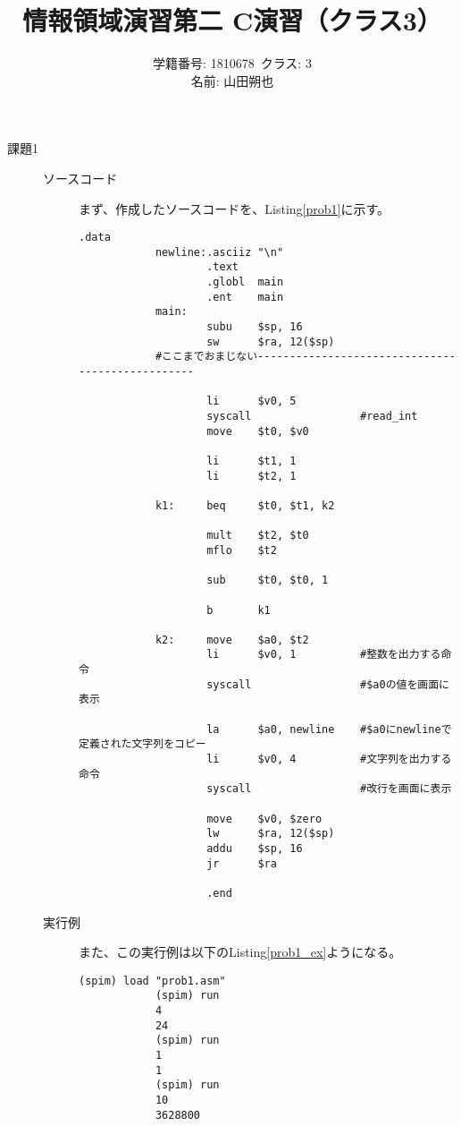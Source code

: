 \documentclass{jsarticle}
\title{情報領域演習第二 C演習（クラス3）}
\author{学籍番号: 1810678\ クラス: 3 \\
        名前: 山田朔也}
\begin{document}
    \maketitle
    \begin{description}
        \item[課題1]
        \begin{description}
            \item[ソースコード]
            まず、作成したソースコードを、Listing\ref{prob1}に示す。
            \begin{lstlisting}[caption=課題1のソースコード, label=prob1]
                    .data
            newline:.asciiz "\n"
                    .text
                    .globl  main
                    .ent    main
            main:
                    subu    $sp, 16
                    sw      $ra, 12($sp)
            #ここまでおまじない-------------------------------------------------

                    li      $v0, 5
                    syscall                 #read_int
                    move    $t0, $v0

                    li      $t1, 1
                    li      $t2, 1

            k1:     beq     $t0, $t1, k2

                    mult    $t2, $t0
                    mflo    $t2

                    sub     $t0, $t0, 1

                    b       k1

            k2:     move    $a0, $t2
                    li      $v0, 1          #整数を出力する命令
                    syscall                 #$a0の値を画面に表示

                    la      $a0, newline    #$a0にnewlineで定義された文字列をコピー
                    li      $v0, 4          #文字列を出力する命令
                    syscall                 #改行を画面に表示

                    move    $v0, $zero
                    lw      $ra, 12($sp)
                    addu    $sp, 16
                    jr      $ra

                    .end
            \end{lstlisting}

            \item[実行例]
            また、この実行例は以下のListing\ref{prob1_ex}ようになる。
            \begin{lstlisting}[caption=課題1の実行例, label=prob1_ex]
            (spim) load "prob1.asm"
            (spim) run
            4
            24
            (spim) run
            1
            1
            (spim) run
            10
            3628800
            \end{lstlisting}


\end{description}
\end{description}
\end{document}
